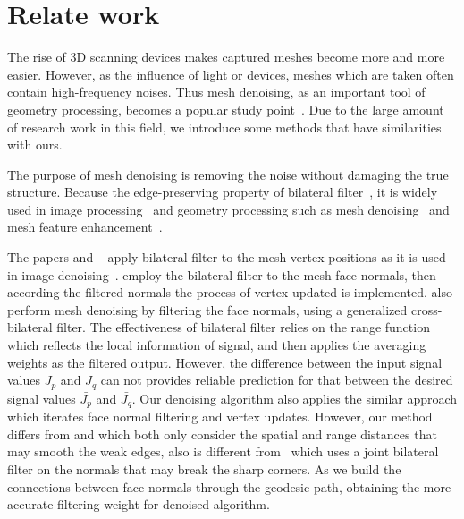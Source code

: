 \section{Relate work}

The rise of 3D scanning devices makes captured meshes become more and more easier.
However, as the influence of light or devices, meshes which are taken often contain high-frequency noises.
Thus mesh denoising, as an important tool of geometry processing, becomes a popular study point~\cite{Wang2008comprehensive}.
Due to the large amount of research work in this field, we introduce some methods that have similarities with ours.

The purpose of mesh denoising is removing the noise without damaging the true structure.
Because the edge-preserving property of bilateral filter~\cite{tomasi1998bilateral}, it is widely used in image processing~\cite{oh2001image, durand2002fast, Barash2004common, Wang2014decoupling} and geometry processing such as mesh denoising~\cite{fleishman2003bilateral, jones2003non, zheng2011bilateral, Solomon2014general} and mesh feature enhancement~\cite{Wang2006bilateral}.

The papers \cite{fleishman2003bilateral} and ~\cite{jones2003non} apply bilateral filter to the mesh vertex positions as it is used in image denoising~\cite{durand2002fast}.
\cite{zheng2011bilateral} employ the bilateral filter to the mesh face normals, then according the filtered normals the process of vertex updated is implemented.
\cite{Solomon2014general} also perform mesh denoising by filtering the face normals, using a generalized cross-bilateral filter.
The effectiveness of bilateral filter relies on the range function which reflects the local information of signal, and then applies the averaging weights as the filtered output.
However, the difference between the input signal values $J_{p}$ and $J_{q}$ can not provides reliable prediction for that between the desired signal values $\bar{J_{p}}$ and $\bar{J_{q}}$.
Our denoising algorithm also applies the similar approach which iterates face normal filtering and vertex updates.
However, our method differs from \cite{zheng2011bilateral} and \cite{Solomon2014general} which both only consider the spatial and range distances that may smooth the weak edges,
also is different from~\cite{Zhang2015Filter} which uses a joint bilateral filter on the normals that may break the sharp corners.
As we build the connections between face normals through the geodesic path, obtaining the more accurate filtering weight for denoised algorithm.


